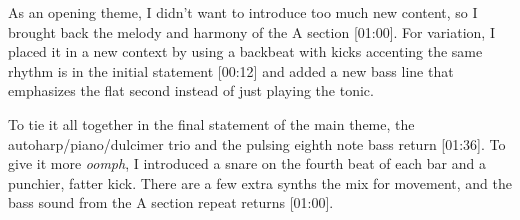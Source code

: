 As an opening theme, I didn't want to introduce too much new content, so I brought back the melody and harmony of the A section [01:00]. For variation, I placed it in a new context by using a backbeat
with kicks accenting the same rhythm is in the initial statement [00:12] and added a new bass line that emphasizes the flat second instead of just playing the tonic.

To tie it all together in the final statement of the main theme, the autoharp/piano/dulcimer trio and the pulsing eighth note bass return [01:36]. To give it more \textit{oomph}, I introduced a snare on the fourth beat of each bar and a punchier, fatter kick. There are a few extra synths the mix for movement, and the bass sound from the A section repeat returns [01:00].

